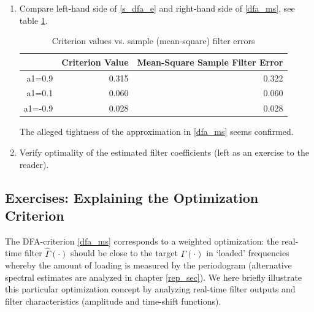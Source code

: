\documentclass[a4paper]{book}
\begin{document}
\begin{enumerate}
\begin{Schunk}
\begin{Sinput}
> # Compute time-domain MSE
> mse<-apply(na.exclude((yhat-y))^2,2,mean)
> perf_mat[,2]<-mse
> round(perf_mat[,2],3)
\end{Sinput}
\begin{Soutput}
 a1=0.9  a1=0.1 a1=-0.9 
  0.322   0.060   0.028 
\end{Soutput}
\end{Schunk}
\item Compare left-hand side of \ref{s_dfa_e} and right-hand side of \ref{dfa_ms}, see table \ref{perf_mat}.\\ 
\begin{table}[ht]
\centering
\begin{tabular}{rrr}
  \hline
 & Criterion Value & Mean-Square Sample Filter Error \\ 
  \hline
a1=0.9 & 0.315 & 0.322 \\ 
  a1=0.1 & 0.060 & 0.060 \\ 
  a1=-0.9 & 0.028 & 0.028 \\ 
   \hline
\end{tabular}
\caption{Criterion values vs. sample (mean-square) filter errors} 
\label{perf_mat}
\end{table}The alleged tightness of the approximation in \ref{dfa_ms} seems confirmed.
\item Verify optimality of the estimated filter coefficients (left as an exercise to the reader).

\end{enumerate}



\subsection{Exercises: Explaining the Optimization Criterion}\label{ex_dfa}

The DFA-criterion \ref{dfa_ms} corresponds to a weighted optimization: the real-time filter $\hat{\Gamma}(\cdot)$ should be close to the target $\Gamma(\cdot)$ in `loaded' frequencies whereby the amount of loading is measured by the periodogram (alternative spectral estimates are analyzed in chapter \ref{rep_sec}). We here briefly illustrate this particular optimization concept by analyzing real-time filter outputs and filter characteristics (amplitude and time-shift functions).
\end{document}
